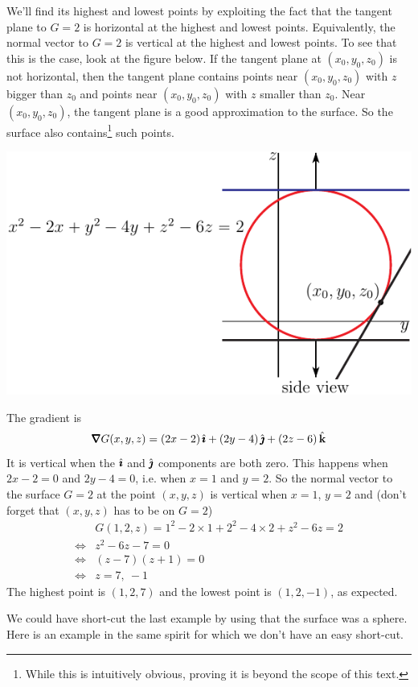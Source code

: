 \begin{eg}
We'll find its highest and lowest points by exploiting the
fact that the tangent plane to $G=2$ is horizontal at the highest and lowest
points. Equivalently, the normal vector to $G=2$ is vertical at the highest 
and lowest points. To see that this is the case, look at the figure below. 
If the tangent plane at $(x_0,y_0,z_0)$ is not horizontal, then the 
tangent plane contains points near $(x_0,y_0,z_0)$ with $z$ bigger 
than $z_0$ and points near $(x_0,y_0,z_0)$ with $z$ smaller than $z_0$. 
Near $(x_0,y_0,z_0)$, the tangent plane is a good approximation to the
surface. So the surface also contains\footnote{While this is intuitively
obvious, proving it is beyond the scope of this text.} such points.
\begin{efig}
\begin{center}
   \includegraphics{highLowB.pdf}
\end{center}
\end{efig}
The gradient is
\begin{equation*}
\vnabla G(x,y,z) = (2x-2)\,\hi + (2y-4)\,\hj + (2z-6)\,\hk
\end{equation*}
It is vertical when the $\hat{\pmb{\imath}}$ and $\hat{\pmb{\jmath}}$ components are both zero.
This happens when $2x-2=0$ and $2y-4=0$, i.e. when $x=1$ and $y=2$.
So the normal vector to the surface $G=2$ at the point $(x,y,z)$
is vertical when $x=1$, $y=2$ and (don't forget that $(x,y,z)$ has to be
on $G=2$)
\begin{align*}
&G(1,2,z) = 1^2-2\times 1 +2^2-4\times 2 + z^2-6z = 2 \\
\iff & z^2-6z-7=0 \\
\iff & (z-7)(z+1)=0 \\
\iff & z=7,\ -1
\end{align*}
The highest point is $(1,2,7)$ and the lowest point is $(1,2,-1)$,
as expected.
\end{eg}
We could have short-cut the last example by using that the surface was 
a sphere. Here is an example in the same spirit for which we don't have 
an easy short-cut.

